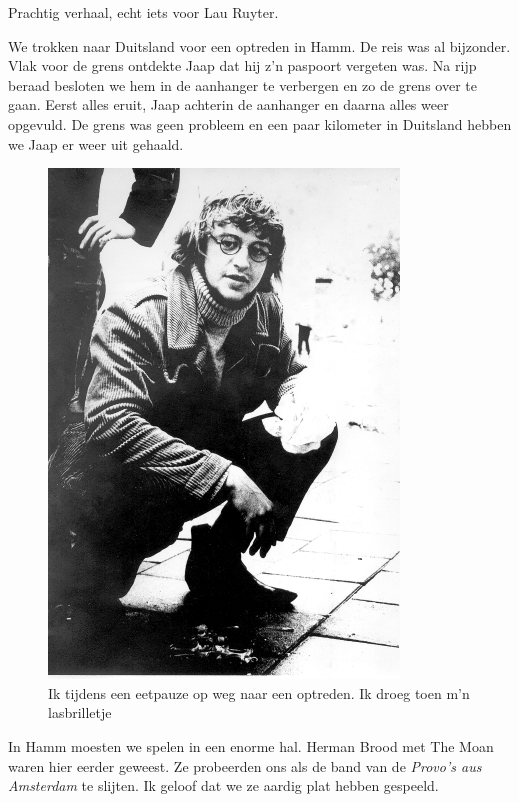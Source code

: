 \documentclass[12pt,twoside, openright]{memoir}
\begin{document}
Prachtig verhaal, echt iets voor Lau Ruyter.

We trokken naar Duitsland voor een optreden in Hamm. De reis was al bijzonder. Vlak voor de grens ontdekte Jaap dat hij z’n paspoort vergeten was. Na rijp beraad besloten we hem in de aanhanger te verbergen en zo de grens over te gaan. Eerst alles eruit, Jaap achterin de aanhanger en daarna alles weer opgevuld. De grens was geen probleem en een paar kilometer in Duitsland hebben we Jaap er weer uit gehaald. 

\begin{figure}
\centering
\includegraphics[width=\textwidth]{img/ch30/optourneeAs}
\caption*{\footnotesize Ik tijdens een eetpauze op weg naar een optreden. Ik droeg toen m'n lasbrilletje}
\end{figure}

In Hamm moesten we spelen in een enorme hal. Herman Brood met The Moan waren hier eerder geweest. Ze probeerden ons als de band van de \emph{Provo’s aus Amsterdam} te slijten. Ik geloof dat we ze aardig plat hebben gespeeld.
\end{document}
